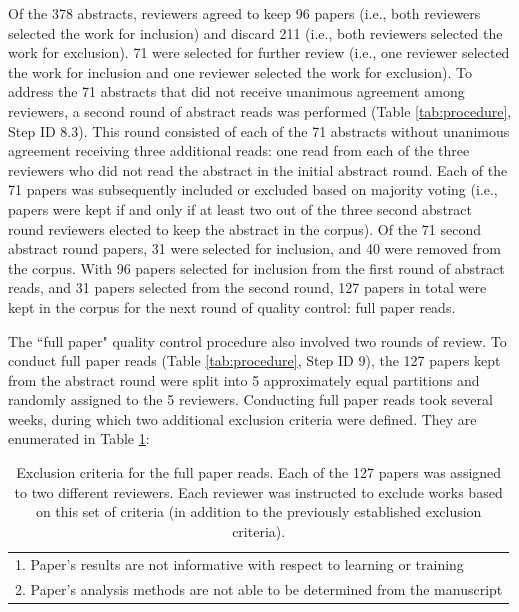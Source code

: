 \documentclass[manuscript,screen,review]{acmart}
\begin{document}
Of the 378 abstracts, reviewers agreed to keep 96 papers (i.e., both reviewers selected the work for inclusion) and discard 211 (i.e., both reviewers selected the work for exclusion). 71 were selected for further review (i.e., one reviewer selected the work for inclusion and one reviewer selected the work for exclusion). To address the 71 abstracts that did not receive unanimous agreement among reviewers, a second round of abstract reads was performed (Table \ref{tab:procedure}, Step ID 8.3). This round consisted of each of the 71 abstracts without unanimous agreement receiving three additional reads: one read from each of the three reviewers who did not read the abstract in the initial abstract round. Each of the 71 papers was subsequently included or excluded based on majority voting (i.e., papers were kept if and only if at least two out of the three second abstract round reviewers elected to keep the abstract in the corpus). Of the 71 second abstract round papers, 31 were selected for inclusion, and 40 were removed from the corpus. With 96 papers selected for inclusion from the first round of abstract reads, and 31 papers selected from the second round, 127 papers in total were kept in the corpus for the next round of quality control: full paper reads.

The ``full paper" quality control procedure also involved two rounds of review. To conduct full paper reads (Table \ref{tab:procedure}, Step ID 9), the 127 papers kept from the abstract round were split into 5 approximately equal partitions and randomly assigned to the 5 reviewers. Conducting full paper reads took several weeks, during which two additional exclusion criteria were defined. They are enumerated in Table \ref{tab:full_paper_exclusion_criteria}:

\begin{table}[htbp]
    \renewcommand{\arraystretch}{1.3}%
    \centering
    \caption{Exclusion criteria for the full paper reads. Each of the 127 papers was assigned to two different reviewers. Each reviewer was instructed to exclude works based on this set of criteria (in addition to the previously established exclusion criteria).}
    \begin{tabularx}{\linewidth}{l@{\hskip .25in}}
    
        \midrule
        
        1. Paper's results are not informative with respect to learning or training \\
        2. Paper's analysis methods are not able to be determined from the manuscript\\

        \bottomrule
    \end{tabularx}
    \label{tab:full_paper_exclusion_criteria}
\end{table}
\end{document}
